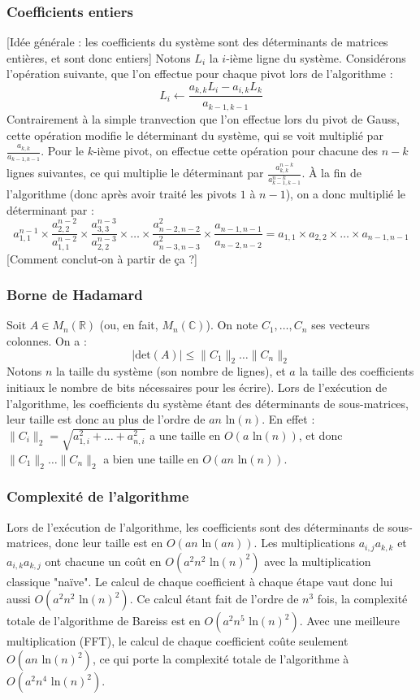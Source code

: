 \documentclass[french]{article}
\begin{document}
\subsubsection{Coefficients entiers}
[Idée générale : les coefficients du système sont des déterminants de matrices entières, et sont donc entiers]
\newline
Notons $L_i$ la $i$-ième ligne du système. Considérons l'opération suivante, que l'on effectue pour chaque pivot lors de l'algorithme :
$$L_i \gets \frac{a_{k,k} L_i - a_{i,k} L_k}{a_{k-1,k-1}}$$
Contrairement à la simple tranvection que l'on effectue lors du pivot de Gauss, cette opération modifie le déterminant du système, qui se voit multiplié par $\frac{a_{k,k}}{a_{k-1,k-1}}$.
Pour le $k$-ième pivot, on effectue cette opération pour chacune des $n-k$ lignes suivantes, ce qui multiplie le déterminant par $\frac{a_{k,k}^{n-k}}{a_{k-1,k-1}^{n-k}}$.
À la fin de l'algorithme (donc après avoir traité les pivots $1$ à $n-1$), on a donc multiplié le déterminant par :
$$a_{1,1}^{n-1} \times \frac{a_{2,2}^{n-2}}{a_{1,1}^{n-2}} \times \frac{a_{3,3}^{n-3}}{a_{2,2}^{n-3}} \times \hdots \times \frac{a_{n-2,n-2}^2}{a_{n-3,n-3}^2} \times \frac{a_{n-1,n-1}}{a_{n-2,n-2}} = a_{1,1} \times a_{2,2} \times \hdots \times a_{n-1,n-1}$$
[Comment conclut-on à partir de ça ?]
\newline
\subsubsection{Borne de Hadamard} \label{subsubsec:hada}
Soit $A \in M_n(\mathbb{R})$ (ou, en fait, $M_n(\mathbb{C})$). On note $C_1,\hdots,C_n$ ses vecteurs colonnes. On a :
$$ \lvert \mbox{det}(A) \rvert \le \lVert C_1 \rVert_2 \hdots \lVert C_n \rVert_2$$
Notons $n$ la taille du système (son nombre de lignes), et $a$ la taille des coefficients initiaux le nombre de bits nécessaires pour les écrire). Lors de l'exécution de l'algorithme, les coefficients du système étant des déterminants de sous-matrices, leur taille est donc au plus de l'ordre de $a n \mbox{ ln}(n)$.
\newline
[Preuve ??]
\newline
En effet : $\lVert C_i \rVert_2 = \sqrt{a_{1,i}^2 + \hdots + a_{n,i}^2}$ a une taille en $O(a \mbox{ ln}(n))$, et donc $\lVert C_1 \rVert_2 \hdots \lVert C_n \rVert_2$ a bien une taille en $O(a n \mbox{ ln}(n))$.
\subsubsection{Complexité de l'algorithme}
 Lors de l'exécution de l'algorithme, les coefficients sont des déterminants de sous-matrices, donc leur taille est en $O(an \mbox{ ln}(a n))$. Les multiplications $a_{i,j} a_{k,k}$ et $a_{i,k} a_{k,j}$ ont chacune un coût en $O(a^2 n^2 \mbox{ ln}(n)^2)$ avec la multiplication classique "naïve". Le calcul de chaque coefficient à chaque étape vaut donc lui aussi $O(a^2 n^2 \mbox{ ln}(n)^2)$. Ce calcul étant fait de l'ordre de $n^3$ fois, la complexité totale de l'algorithme de Bareiss est en $O(a^2 n^5 \mbox{ ln}(n)^2)$. Avec une meilleure multiplication (FFT), le calcul de chaque coefficient coûte seulement $O(a n \mbox{ ln}(n)^2)$, ce qui porte la complexité totale de l'algorithme à $O(a^2 n^4 \mbox{ ln}(n)^2)$.
\end{document}
